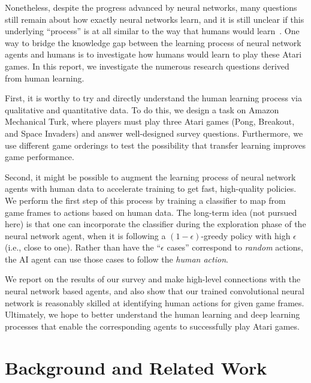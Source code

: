 \documentclass[letterpaper, 10 pt, conference]{ieeeconf}  %
\begin{document}
Nonetheless, despite the progress advanced by neural networks, many questions still remain about how
exactly neural networks learn, and it is still unclear if this underlying ``process'' is at all
similar to the way that humans would
learn~\cite{szegedy2013intriguing,nguyen2015deep,goodfellow2014explaining}.  One way to bridge the
knowledge gap between the learning process of neural network agents and humans is to investigate how
humans would learn to play these Atari games. In this report, we investigate the numerous research
questions derived from human learning.

First, it is worthy to try and directly understand the human learning process via qualitative and
quantitative data. To do this, we design a task on Amazon Mechanical Turk, where players must play
three Atari games (Pong, Breakout, and Space Invaders) and answer well-designed survey questions.
Furthermore, we use different game orderings to test the possibility that transfer learning improves
game performance.

Second, it might be possible to augment the learning process of neural network agents with human
data to accelerate training to get fast, high-quality policies. We perform the first step of this
process by training a classifier to map from game frames to actions based on human data. The
long-term idea (not pursued here) is that one can incorporate the classifier during the exploration
phase of the neural network agent, when it is following a $(1-\epsilon)$-greedy policy with high
$\epsilon$ (i.e., close to one). Rather than have the ``$\epsilon$ cases'' correspond to
\emph{random} actions, the AI agent can use those cases to follow the \emph{human action}.

We report on the results of our survey and make high-level connections with the neural network based
agents, and also show that our trained convolutional neural network is reasonably skilled at
identifying human actions for given game frames. Ultimately, we hope to better understand the human
learning and deep learning processes that enable the corresponding agents to successfully play Atari
games.



\section{Background and Related Work}\label{sec:related_work}
\end{document}
